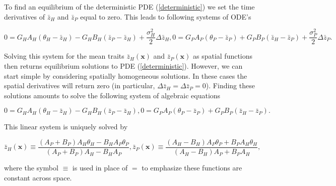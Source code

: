 \documentclass{article}
\begin{document}
To find an equilibrium of the deterministic PDE (\ref{deterministic}) we
set the time derivatives of \(\bar z_H\) and \(\bar z_P\) equal to zero.
This leads to following systems of ODE's

\begin{subequations}
  \begin{equation}
    0=G_HA_H(\theta_H-\bar z_H)-G_HB_H(\bar z_P-\bar z_H)+\frac{\sigma^2_H}{2}\Delta\bar z_H,
  \end{equation}
  \begin{equation}
    0=G_PA_P(\theta_P-\bar z_P)+G_PB_P(\bar z_H-\bar z_P)+\frac{\sigma^2_P}{2}\Delta\bar z_P.
  \end{equation}
\end{subequations}

Solving this system for the mean traits \(\bar z_H(\pmb x)\) and
\(\bar z_P(\pmb x)\) as spatial functions then returns equilibrium
solutions to PDE (\ref{deterministic}). However, we can start simple by
considering spatially homogeneous solutions. In these cases the spatial
derivatives will return zero (in particular,
\(\Delta\bar z_H=\Delta\bar z_P=0\)). Finding these solutions amounts to
solve the following system of algebraic equations

\begin{subequations}
  \begin{equation}
    0=G_HA_H(\theta_H-\bar z_H)-G_HB_H(\bar z_P-\bar z_H),
  \end{equation}
  \begin{equation}
    0=G_PA_P(\theta_P-\bar z_P)+G_PB_P(\bar z_H-\bar z_P).
  \end{equation}
\end{subequations}

This linear system is uniquely solved by

\begin{subequations}\label{non-spatial-eq}
  \begin{equation}
    \bar z_H(\pmb x)\equiv\frac{(A_P+B_P)A_H\theta_H-B_HA_P\theta_P}{(A_P+B_P)A_H-B_HA_P},
  \end{equation}
  \begin{equation}
    \bar z_P(\pmb x)\equiv\frac{(A_H-B_H)A_P\theta_P+B_PA_H\theta_H}{(A_H-B_H)A_P+B_PA_H},
  \end{equation}
\end{subequations}

where the symbol \(\equiv\) is used in place of \(=\) to emphasize these
functions are constant across space.
\end{document}
